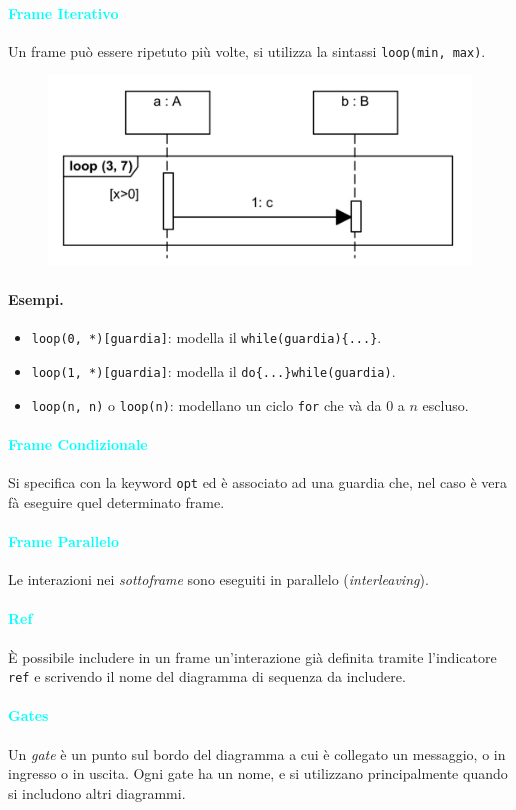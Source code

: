 \paragraph{\textcolor{cyan}{Frame Iterativo}} Un frame può essere ripetuto più volte, si utilizza
la sintassi \verb|loop(min, max)|.

\begin{figure}[H]
    \centering
    \includegraphics[scale=0.4]{img/frame_iterativo.png}
\end{figure}

\paragraph{Esempi.}

\begin{itemize}
    \item \verb|loop(0, *)[guardia]|: modella il \verb|while(guardia){...}|.
    \item \verb|loop(1, *)[guardia]|: modella il \verb|do{...}while(guardia)|.
    \item \verb|loop(n, n)| o \verb|loop(n)|: modellano un ciclo \verb|for| che và da $0$ a $n$ escluso.
\end{itemize}

\paragraph{\textcolor{cyan}{Frame Condizionale}} Si specifica con la keyword \verb|opt| ed è associato
ad una guardia che, nel caso è vera fà eseguire quel determinato frame.

\paragraph{\textcolor{cyan}{Frame Parallelo}} Le interazioni nei \emph{sottoframe} sono eseguiti
in parallelo (\emph{interleaving}).

\paragraph{\textcolor{cyan}{Ref}} È possibile includere in un frame un'interazione già definita tramite
l'indicatore \verb|ref| e scrivendo il nome del diagramma di sequenza da includere.

\paragraph{\textcolor{cyan}{Gates}} Un \emph{gate} è un punto sul bordo del diagramma a cui è
collegato un messaggio, o in ingresso o in uscita. Ogni gate ha un nome, e si utilizzano principalmente
quando si includono altri diagrammi.
